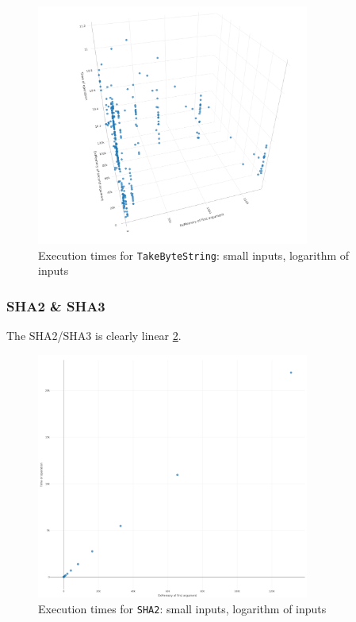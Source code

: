 \documentclass[a4paper]{article}
\begin{document}
\begin{figure}
\centering
  \includegraphics[width=0.8\textwidth]{figures/TakeByteString.png}
  \caption{Execution times for \texttt{TakeByteString}: small inputs, logarithm of inputs}
  \label{fig:TakeByteString}
\end{figure}

\subsubsection*{SHA2 \& SHA3}

The SHA2/SHA3 is clearly linear \ref{fig:SHA2}.

\begin{figure}
\centering
  \includegraphics[width=0.8\textwidth]{figures/SHA2.png}
  \caption{Execution times for \texttt{SHA2}: small inputs, logarithm of inputs}
  \label{fig:SHA2}
\end{figure}
\end{document}
